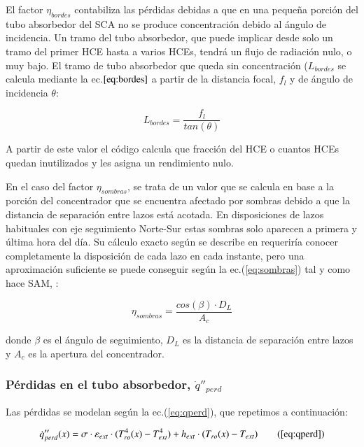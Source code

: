 El factor \(\eta_{bordes}\) contabiliza las pérdidas debidas a que en una   pequeña porción del tubo absorbedor del SCA no se produce   concentración debido al ángulo de incidencia. Un tramo del tubo   absorbedor, que puede implicar desde solo un tramo del primer HCE  hasta a varios HCEs, tendrá un flujo de radiación nulo, o muy bajo. El   tramo de tubo absorbedor que queda sin concentración (\(L_{bordes}\)   se calcula mediante la ec.\(\eqref{eq:bordes}\) a partir de la   distancia focal, \(f_l\) y de ángulo de incidencia \(\theta\):

\begin{equation}
   L_{bordes} = \frac {f_l}{tan(\theta)}
    \label{eq:bordes}
\end{equation}

A partir de este valor el código calcula que fracción del HCE o cuantos HCEs quedan inutilizados y les asigna un rendimiento nulo.

En el caso del factor \(\eta_{sombras}\), se trata de un valor que se calcula en base a la porción del concentrador que se encuentra afectado por sombras debido a que la distancia de separación entre lazos está acotada. En disposiciones de lazos habituales con eje seguimiento Norte-Sur estas sombras solo aparecen a primera y última hora del día. Su cálculo exacto según se describe en \cite{sharmaShadingAvailableEnergy2013} requeriría conocer completamente la disposición de cada lazo en cada instante, pero una aproximación suficiente se puede conseguir según la ec.(\eqref{eq:sombras}) tal y como hace SAM, \cite{gilmanSolarAdvisorModel2008}:

\begin{equation}
   \eta_{sombras} =  \frac {cos(\beta) \cdot D_L}{A_c}
    \label{eq:sombras}
\end{equation}

donde $\beta$ es el ángulo de seguimiento, $D_L$ es la distancia de separación entre lazos y $A_c$ es la apertura del concentrador.

\subsubsection{Pérdidas en el tubo absorbedor, $\dot q''_{perd}$}

Las pérdidas se modelan según la ec.(\ref{eq:qperd}), que repetimos a continuación:

\begin{equation}
\notag  \dot q''_{perd}(x)= \sigma \cdot \varepsilon_{ext} \cdot (T_{ro}^{4}(x)-T_{ext}^{4}) + h_{ext} \cdot (T_{ro}(x)-T_{ext}) \tag{\ref{eq:qperd}}
\end{equation}

